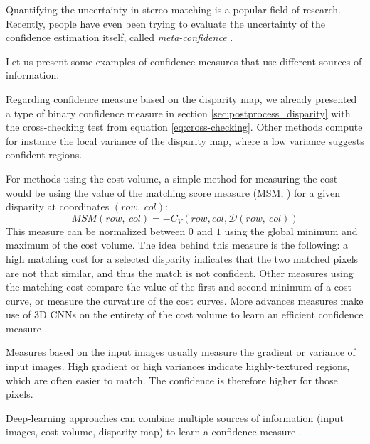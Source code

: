 \begin{remark}
     Quantifying the uncertainty in stereo matching is a popular field of research. Recently, people have even been trying to evaluate the uncertainty of the confidence estimation itself, called \textit{meta-confidence} \cite{kim_meta-confidence_2022}.
\end{remark}

\begin{example}
    Let us present some examples of confidence measures that use different sources of information.
    
    Regarding confidence measure based on the disparity map, we already presented a type of binary confidence measure in section \ref{sec:postprocess_disparity} with the cross-checking test from equation \eqref{eq:cross-checking}. Other methods compute for instance the local variance of the disparity map, where a low variance suggests confident regions.
    
    For methods using the cost volume, a simple method for measuring the cost would be using the value of the matching score measure (MSM, \cite{egnal_stereo_2004}) for a given disparity at coordinates $(row, ~col)$:
    \begin{equation}
        MSM(row, ~col) = -C_V(row, col, \mathcal{D}(row, ~col))
    \end{equation}
    This measure can be normalized between $0$ and $1$ using the global minimum and maximum of the cost volume. The idea behind this measure is the following: a high matching cost for a selected disparity indicates that the two matched pixels are not that similar, and thus the match is not confident. Other measures using the matching cost compare the value of the first and second minimum of a cost curve, or measure the curvature of the cost curves. More advances measures make use of 3D CNNs on the entirety of the cost volume to learn an efficient confidence measure \cite{mehltretter_cnn-based_2019}.
    
    Measures based on the input images usually measure the gradient \cite{haeusler_ensemble_2013} or variance \cite{park_learning_2019} of input images. High gradient or high variances indicate highly-textured regions, which are often easier to match. The confidence is therefore higher for those pixels. 
    
    Deep-learning approaches can combine multiple sources of information (input images, cost volume, disparity map) to learn a confidence measure \cite{tosi_beyond_2018, kim_adversarial_2020}.
\end{example}

